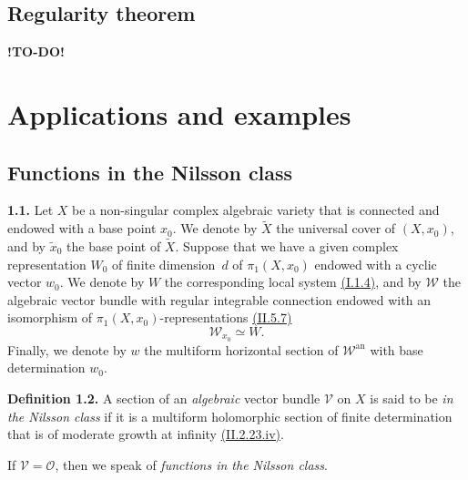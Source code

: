 \documentclass{report}
\newenvironment{rmenv}[1]
  {\phantomsection\par\medskip\noindent\textbf{#1.}\rmfamily}
  {\par\medskip}
\newcommand{\scr}[1]{{\mathscr{#1}}}
\renewcommand{\cal}[1]{{\mathcal{#1}}}
\newcommand{\an}{\mathrm{an}}
\newcommand{\todo}{\textbf{ !TO-DO! }}
\newcommand{\oldpage}[1]{\marginpar{\footnotesize$\Big\vert$ \textit{p.~#1}}}
\begin{document}
\section{Regularity theorem}
\label{II.7}










\todo













\chapter{Applications and examples}
\label{III}


\section{Functions in the Nilsson class}
\label{III.1}

\begin{rmenv}{1.1}
\label{III.1.1}
\oldpage{122}
  Let $X$ be a non-singular complex algebraic variety that is connected and endowed with a base point $x_0$.
  We denote by $\widetilde{X}$ the universal cover of $(X,x_0)$, and by $\widetilde{x}_0$ the base point of $\widetilde{X}$.
  Suppose that we have a given complex representation $W_0$ of finite dimension~$d$ of $\pi_1(X,x_0)$ endowed with a cyclic vector $w_0$.
  We denote by $W$ the corresponding local system \hyperref[I.1.4]{(I.1.4)}, and by $\scr{W}$ the algebraic vector bundle with regular integrable connection endowed with an isomorphism of $\pi_1(X,x_0)$-representations \hyperref[II.5.7]{(II.5.7)}
  \[
    \scr{W}_{x_0} \simeq W.
  \]
  Finally, we denote by $w$ the multiform horizontal section of $\scr{W}^\an$ with base determination $w_0$.
\end{rmenv}

\begin{rmenv}{Definition 1.2}
\label{III.1.2}
  A section of an \emph{algebraic} vector bundle $\cal{V}$ on $X$ is said to be \emph{in the Nilsson class} if it is a multiform holomorphic section of finite determination that is of moderate growth at infinity \hyperref[II.2.23]{(II.2.23.iv)}.

  If $\cal{V}=\cal{O}$, then we speak of \emph{functions in the Nilsson class}.
\end{rmenv}
\end{document}
